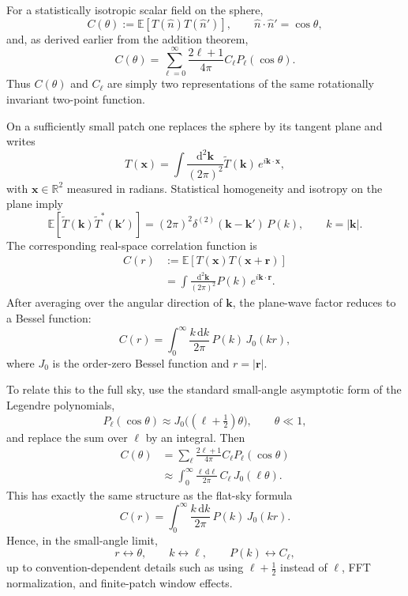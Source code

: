 \documentclass[11pt]{article}
\newcommand{\EE}{\mathbb{E}}
\newcommand{\RR}{\mathbb{R}}
\newcommand{\dd}{\mathrm{d}}
\begin{document}
For a statistically isotropic scalar field on the sphere,
\begin{equation}
  C(\theta)
  :=
  \EE[T(\hat n)T(\hat n')],
  \qquad
  \hat n\cdot\hat n'=\cos\theta,
\end{equation}
and, as derived earlier from the addition theorem,
\begin{equation}
  C(\theta)
  =
  \sum_{\ell=0}^{\infty}
  \frac{2\ell+1}{4\pi}
  C_\ell
  P_\ell(\cos\theta).
\end{equation}
Thus \(C(\theta)\) and \(C_\ell\) are simply two representations of the same rotationally invariant two-point function.

On a sufficiently small patch one replaces the sphere by its tangent plane and writes
\begin{equation}
  T(\bm{x})
  =
  \int \frac{\dd^2\bm{k}}{(2\pi)^2}
  \widetilde T(\bm{k})\,e^{i\bm{k}\cdot\bm{x}},
\end{equation}
with \(\bm{x}\in\RR^2\) measured in radians. Statistical homogeneity and isotropy on the plane imply
\begin{equation}
  \EE\!\left[\widetilde T(\bm{k})\widetilde T^\ast(\bm{k}')\right]
  =
  (2\pi)^2\delta^{(2)}(\bm{k}-\bm{k}')\,P(k),
  \qquad
  k=|\bm{k}|.
\end{equation}
The corresponding real-space correlation function is
\begin{align}
  C(r)
  &:=
  \EE[T(\bm{x})T(\bm{x}+\bm{r})] \\
  &=
  \int \frac{\dd^2\bm{k}}{(2\pi)^2}
  P(k)\,e^{i\bm{k}\cdot\bm{r}}.
\end{align}
After averaging over the angular direction of \(\bm{k}\), the plane-wave factor reduces to a Bessel function:
\begin{equation}
  C(r)
  =
  \int_0^\infty \frac{k\,\dd k}{2\pi}\,
  P(k)\,J_0(kr),
\end{equation}
where \(J_0\) is the order-zero Bessel function and \(r=|\bm{r}|\).

To relate this to the full sky, use the standard small-angle asymptotic form of the Legendre polynomials,
\begin{equation}
  P_\ell(\cos\theta)
  \approx
  J_0\!\big((\ell+\tfrac12)\theta\big),
  \qquad
  \theta\ll 1,
\end{equation}
and replace the sum over \(\ell\) by an integral. Then
\begin{align}
  C(\theta)
  &=
  \sum_{\ell}
  \frac{2\ell+1}{4\pi} C_\ell P_\ell(\cos\theta) \\
  &\approx
  \int_0^\infty \frac{\ell\,\dd\ell}{2\pi}\,
  C_\ell\,J_0(\ell\theta).
\end{align}
This has exactly the same structure as the flat-sky formula
\begin{equation}
  C(r)
  =
  \int_0^\infty \frac{k\,\dd k}{2\pi}\,
  P(k)\,J_0(kr).
\end{equation}
Hence, in the small-angle limit,
\begin{equation}
  r \leftrightarrow \theta,
  \qquad
  k \leftrightarrow \ell,
  \qquad
  P(k) \leftrightarrow C_\ell,
\end{equation}
up to convention-dependent details such as using \(\ell+\tfrac12\) instead of \(\ell\), FFT normalization, and finite-patch window effects.
\end{document}
